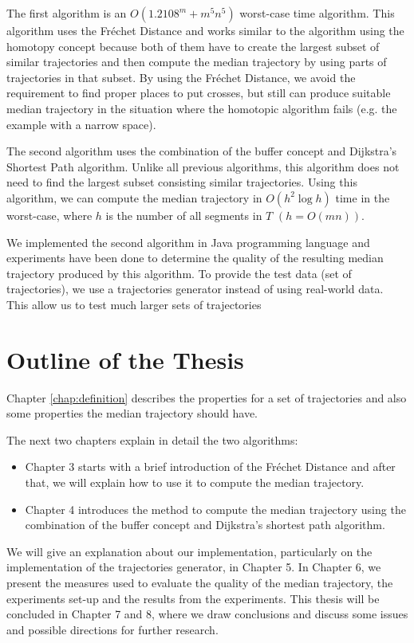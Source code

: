 The first algorithm is an $O(1.2108^{m} + m^{5}n^{5})$ worst-case time algorithm.
This algorithm uses the Fr\'{e}chet Distance \cite{AltGodau:1995} and works similar to the algorithm using the homotopy concept because both of them have to create the largest subset of similar trajectories and then compute the median trajectory by using parts of trajectories in that subset. 
By using the Fr\'{e}chet Distance, we avoid the requirement to find proper places to put crosses, but still can produce suitable median trajectory in the situation where the homotopic algorithm fails (e.g. the example with a narrow space).

The second algorithm uses the combination of the buffer concept and Dijkstra's Shortest Path algorithm.
Unlike all previous algorithms, this algorithm does not need to find the largest subset consisting similar trajectories. 
Using this algorithm, we can compute the median trajectory in $O(h^{2} \log h)$ time in the worst-case, where $h$ is the number of all segments in $T$ $(h = O(mn))$.

We implemented the second algorithm in Java programming language and experiments have been done to determine the quality of the resulting median trajectory produced by this algorithm.
To provide the test data (set of trajectories), we use a trajectories generator instead of using real-world data.
This allow us to test much larger sets of trajectories

\section{Outline of the Thesis}
\label{sec:outline}

Chapter \ref{chap:definition} describes the properties for a set of trajectories and also some properties the median trajectory should have.

The next two chapters explain in detail the two algorithms:
\begin{itemize}
\item 
Chapter 3 starts with a brief introduction of the Fr\'{e}chet Distance and after that, we will explain how to use it to compute the median trajectory. 
\item 
Chapter 4 introduces the method to compute the median trajectory using the combination of the buffer concept and Dijkstra's shortest path algorithm. 
\end{itemize}

We will give an explanation about our implementation, particularly on the implementation of the trajectories generator, in Chapter 5.
In Chapter 6, we present the measures used to evaluate the quality of the median trajectory, the experiments set-up and the results from the experiments.
This thesis will be concluded in Chapter 7 and 8, where we draw conclusions and discuss some issues and possible directions for further research.

\lipsum[1-14]